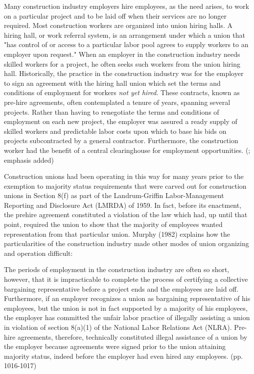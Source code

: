 \documentclass[12pt]{article}
\renewenvironment{quote}
  {\list{}{\leftmargin=\parindent\rightmargin=0pt}%
   \item\relax}
  {\endlist}
\begin{document}
\begin{quote}
Many construction industry employers hire employees, as the need arises, to work on a particular project and to be laid off when their services are no longer required. Most construction workers are organized into union hiring halls. A hiring hall, or work referral system, is an arrangement under which a union that "has control of or access to a particular labor pool agrees to supply workers to an employer upon request." When an employer in the construction industry needs skilled workers for a project, he often seeks such workers from the union hiring hall. Historically, the practice in the construction industry was for the employer to sign an agreement with the hiring hall union which set the terms and conditions of employment for workers \textit{not yet hired}. These contracts, known as pre-hire agreements, often contemplated a tenure of years, spanning several projects. Rather than having to renegotiate the terms and conditions of employment on each new project, the employer was assured a ready supply of skilled workers and predictable labor costs upon which to base his bids on projects subcontracted by a general contractor. Furthermore, the construction worker had the benefit of a central clearinghouse for employment opportunities. (\cite[1014-1015]{murphyPreHireAgreementsSection1982}; emphasis added)
\end{quote}

Construction unions had been operating in this way for many years prior to the exemption to majority status requirements that were carved out for construction unions in Section 8(f) as part of the Landrum-Griffin Labor-Management Reporting and Disclosure Act (LMRDA) of 1959. In fact, before its enactment, the prehire agreement constituted a violation of the law which had, up until that point, required the union to show that the majority of employees wanted representation from that particular union. Murphy (1982) explains how the particularities of the construction industry made other modes of union organizing and operation difficult:

\begin{quote}
The periods of employment in the construction industry are often so short, however, that it is impracticable to complete the process of certifying a collective bargaining representative before a project ends and the employees are laid off. Furthermore, if an employer recognizes a union as bargaining representative of his employees, but the union is not in fact supported by a majority of his employees, the employer has committed the unfair labor practice of illegally assisting a union in violation of section 8(a)(1) of the National Labor Relations Act (NLRA). Pre-hire agreements, therefore, technically constituted illegal assistance of a union by the employer because agreements were signed prior to the union attaining majority status, indeed before the employer had even hired any employees. (pp. 1016-1017)
\end{quote}
\end{document}
